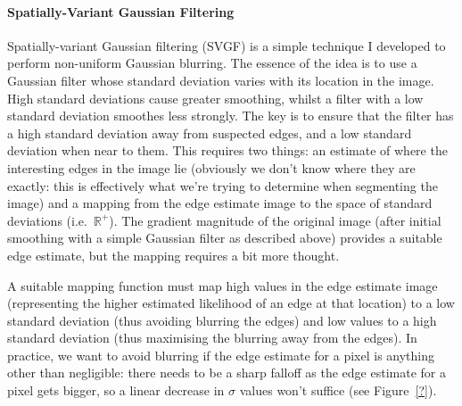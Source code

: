 
\paragraph{Spatially-Variant Gaussian Filtering}

Spatially-variant Gaussian filtering (SVGF) is a simple technique I developed to perform non-uniform Gaussian blurring. The essence of the idea is to use a Gaussian filter whose standard deviation varies with its location in the image. High standard deviations cause greater smoothing, whilst a filter with a low standard deviation smoothes less strongly. The key is to ensure that the filter has a high standard deviation away from suspected edges, and a low standard deviation when near to them. This requires two things: an estimate of where the interesting edges in the image lie (obviously we don't know where they are exactly: this is effectively what we're trying to determine when segmenting the image) and a mapping from the edge estimate image to the space of standard deviations (i.e.~$\mathbb{R}^+$). The gradient magnitude of the original image (after initial smoothing with a simple Gaussian filter as described above) provides a suitable edge estimate, but the mapping requires a bit more thought.

A suitable mapping function must map high values in the edge estimate image (representing the higher estimated likelihood of an edge at that location) to a low standard deviation (thus avoiding blurring the edges) and low values to a high standard deviation (thus maximising the blurring away from the edges). In practice, we want to avoid blurring if the edge estimate for a pixel is anything other than negligible: there needs to be a sharp falloff as the edge estimate for a pixel gets bigger, so a linear decrease in $\sigma$ values won't suffice (see Figure~\ref{?}).


